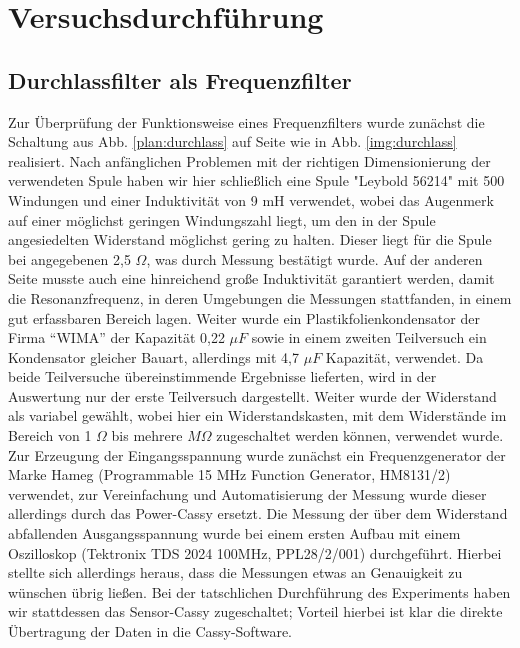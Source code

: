 \section{Versuchsdurchführung}
\subsection{Durchlassfilter als Frequenzfilter}
Zur Überprüfung der Funktionsweise eines Frequenzfilters wurde zunächst die Schaltung aus
Abb. \ref{plan:durchlass} auf Seite \pageref{plan:durchlass} wie in Abb. \ref{img:durchlass} realisiert. Nach anfänglichen Problemen mit der richtigen Dimensionierung der verwendeten Spule haben wir hier schließlich eine Spule "Leybold 56214" mit 500 Windungen und einer Induktivität von 9 mH verwendet, wobei das Augenmerk auf einer möglichst geringen Windungszahl liegt, um den in der Spule angesiedelten Widerstand möglichst gering zu halten. Dieser liegt für die Spule bei angegebenen 2,5 $ \Omega $, was durch Messung bestätigt wurde. Auf
der anderen Seite musste auch eine hinreichend große Induktivität garantiert werden, damit die Resonanzfrequenz, in deren Umgebungen die Messungen stattfanden, in einem gut erfassbaren Bereich lagen. Weiter wurde ein Plastikfolienkondensator der Firma \enquote{WIMA} der Kapazität 0,22 $  \mu F $ sowie in einem zweiten Teilversuch ein Kondensator gleicher Bauart, allerdings mit 4,7 $  \mu F $ Kapazität, verwendet. Da beide Teilversuche übereinstimmende Ergebnisse lieferten, wird in der Auswertung nur der erste Teilversuch dargestellt. Weiter wurde der Widerstand als variabel gewählt, wobei hier ein
Widerstandskasten, mit dem Widerstände im Bereich von 1 $ \Omega $ bis mehrere $M \Omega $ zugeschaltet werden können, verwendet wurde. \\
Zur Erzeugung der Eingangsspannung wurde zunächst ein Frequenzgenerator der Marke Hameg (Programmable 15 MHz Function Generator, HM8131/2) verwendet, zur Vereinfachung und Automatisierung der Messung wurde dieser allerdings durch das Power-Cassy ersetzt.
Die Messung der über dem Widerstand abfallenden Ausgangsspannung wurde bei einem ersten Aufbau mit einem Oszilloskop (Tektronix TDS 2024 100MHz, PPL28/2/001) durchgeführt. Hierbei stellte sich allerdings heraus, dass die Messungen etwas an Genauigkeit zu wünschen übrig ließen. Bei der tatschlichen Durchführung des Experiments haben wir stattdessen das Sensor-Cassy zugeschaltet; Vorteil hierbei ist klar die direkte Übertragung der Daten in die Cassy-Software.

